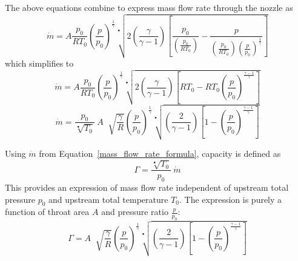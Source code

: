 \documentclass[a4paper, 11pt, twoside]{report}
\begin{document}
The above equations combine to express mass flow rate through the nozzle as
\begin{equation}
\dot{m} =
A
\frac{p_0}{R T_0}
\left(\frac{p}{p_0}\right)^\frac{1}{\gamma}
\sqrt[•]{ 
2 \left( \frac{\gamma}{\gamma - 1} \right) 
\left[ \frac{p_0}{ \left( \frac{p_0}{R T_0} \right) } - \frac{p}{ \left( \frac{p_0}{R T_0} \right) \left(\frac{p}{p_0}\right)^\frac{1}{\gamma} } \right] 
}
\end{equation}
which simplifies to
\begin{equation}
\dot{m} =
A
\frac{p_0}{R T_0}
\left(\frac{p}{p_0}\right)^\frac{1}{\gamma}
\sqrt[•]{
	2 \left( 
		\frac{\gamma}{\gamma - 1} 
	\right)
	\left[ 
		R T_0 - R T_0 \left( \frac{p}{p_0} \right)^\frac{\gamma-1}{\gamma} 
	\right]
}
\end{equation}
\begin{equation}\label{mass_flow_rate_formula}
\dot{m} =
\frac{p_0}{\sqrt[•]{T_0}} \>
A \;
\sqrt[]{\frac{\gamma}{R}}
\left(
    \frac{p}{p_0}
\right)^\frac{1}{\gamma}
\sqrt[•]{
	\left(
		\frac{2}{\gamma - 1}  
	\right)
	\left[
		1 - \left( \frac{p}{p_0} \right)^\frac{\gamma-1}{\gamma}
	\right] 
}
\end{equation}

Using $\dot{m}$ from Equation~\ref{mass_flow_rate_formula}, capacity is defined as
\begin{equation}\label{capacity_definition}
\Gamma = \frac{\sqrt[•]{T_0}}{p_0}  \>
\dot{m}
\end{equation}
This provides an expression of mass flow rate independent of upstream total pressure $p_0$ and upstream total temperature $T_0$. The expression is purely a function of throat area $A$ and pressure ratio $\frac{p}{p_0}$:
\begin{equation}
\Gamma =
A \;
\sqrt[]{\frac{\gamma}{R}}
\left(
    \frac{p}{p_0}
\right)^\frac{1}{\gamma}
\sqrt[•]{
	\left(
		\frac{2}{\gamma - 1}  
	\right)
	\left[
		1 - \left( \frac{p}{p_0} \right)^\frac{\gamma-1}{\gamma}
	\right] 
}
\end{equation}
\end{document}
